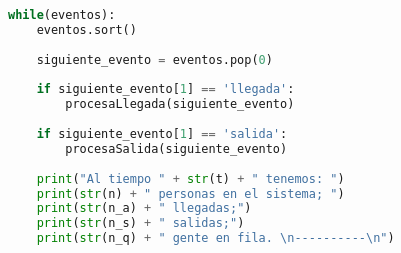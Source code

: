 \documentclass[12pt,letterpaper]{article}
\begin{document}
\begin{lstlisting}[language=python]
while(eventos):
    eventos.sort()
    
    siguiente_evento = eventos.pop(0)
    
    if siguiente_evento[1] == 'llegada':
        procesaLlegada(siguiente_evento)
    
    if siguiente_evento[1] == 'salida':
        procesaSalida(siguiente_evento)
        
    print("Al tiempo " + str(t) + " tenemos: ")
    print(str(n) + " personas en el sistema; ")
    print(str(n_a) + " llegadas;")
    print(str(n_s) + " salidas;")
    print(str(n_q) + " gente en fila. \n----------\n")
\end{lstlisting}
 

\end{document}
